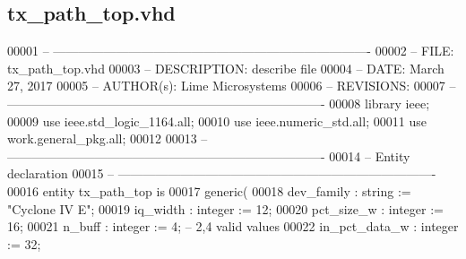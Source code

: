\subsection{tx\+\_\+path\+\_\+top.\+vhd}
\label{tx__path__top_8vhd_source}

\begin{DoxyCode}
00001 \textcolor{keyword}{-- ---------------------------------------------------------------------------- }
00002 \textcolor{keyword}{-- FILE:    tx\_path\_top.vhd}
00003 \textcolor{keyword}{-- DESCRIPTION: describe file}
00004 \textcolor{keyword}{-- DATE:    March 27, 2017}
00005 \textcolor{keyword}{-- AUTHOR(s):   Lime Microsystems}
00006 \textcolor{keyword}{-- REVISIONS:}
00007 \textcolor{keyword}{-- ---------------------------------------------------------------------------- }
00008 \textcolor{vhdlkeyword}{library }\textcolor{keywordflow}{ieee};
00009 \textcolor{vhdlkeyword}{use }ieee.std\_logic\_1164.\textcolor{keywordflow}{all};
00010 \textcolor{vhdlkeyword}{use }ieee.numeric\_std.\textcolor{keywordflow}{all};
00011 \textcolor{vhdlkeyword}{use }work.general_pkg.\textcolor{keywordflow}{all};
00012 
00013 \textcolor{keyword}{-- ----------------------------------------------------------------------------}
00014 \textcolor{keyword}{-- Entity declaration}
00015 \textcolor{keyword}{-- ----------------------------------------------------------------------------}
00016 \textcolor{keywordflow}{entity }tx_path_top \textcolor{keywordflow}{is}
00017    \textcolor{keywordflow}{generic}\textcolor{vhdlchar}{(} 
00018       \textcolor{vhdlchar}{dev_family}           \textcolor{vhdlchar}{:} \textcolor{comment}{string} \textcolor{vhdlchar}{:=} \textcolor{keyword}{"Cyclone IV E"};
00019       \textcolor{vhdlchar}{iq_width}             \textcolor{vhdlchar}{:} \textcolor{comment}{integer} \textcolor{vhdlchar}{:=} \textcolor{vhdllogic}{}\textcolor{vhdllogic}{12};
00020       \textcolor{vhdlchar}{pct_size_w}           \textcolor{vhdlchar}{:} \textcolor{comment}{integer} \textcolor{vhdlchar}{:=} \textcolor{vhdllogic}{}\textcolor{vhdllogic}{16};
00021       \textcolor{vhdlchar}{n_buff}               \textcolor{vhdlchar}{:} \textcolor{comment}{integer} \textcolor{vhdlchar}{:=} \textcolor{vhdllogic}{}\textcolor{vhdllogic}{4};\textcolor{keyword}{ -- 2,4 valid values}
00022       \textcolor{vhdlchar}{in_pct_data_w}        \textcolor{vhdlchar}{:} \textcolor{comment}{integer} \textcolor{vhdlchar}{:=} \textcolor{vhdllogic}{}\textcolor{vhdllogic}{32};

\end{DoxyCode}
